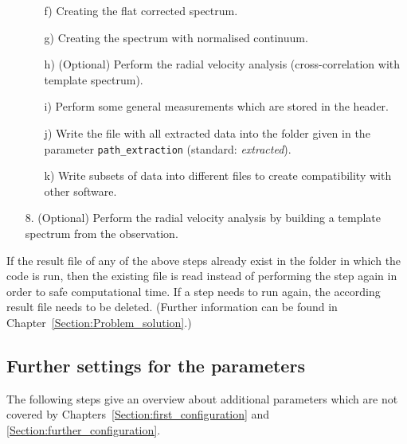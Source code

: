 \documentclass[10pt,a4paper]{article}
\begin{document}
\begin{itemize}
\begin{itemize}
    \item[f)] Creating the flat corrected spectrum.
    \item[g)] Creating the spectrum with normalised continuum.
    \item[h)] (Optional) Perform the radial velocity analysis (cross-correlation with template spectrum).
    \item[i)] Perform some general measurements which are stored in the header.
    \item[j)] Write the file with all extracted data into the folder given in the parameter \verb|path_extraction| (standard: \textit{extracted}).
    \item[k)] Write subsets of data into different files to create compatibility with other software.
  \end{itemize}
  \item[8.] (Optional) Perform the radial velocity analysis by building a template spectrum from the observation.
\end{itemize}

\noindent If the result file of any of the above steps already exist in the folder in which the code is run, then the existing file is read instead of performing the step again in order to safe computational time. If a step needs to run again, the according result file needs to be deleted. (Further information can be found in Chapter~\ref{Section:Problem_solution}.)


\subsection{Further settings for the parameters}
\label{Section:further_parameters}
The following steps give an overview about additional parameters which are not covered by Chapters~\ref{Section:first_configuration} and \ref{Section:further_configuration}.
\end{document}
